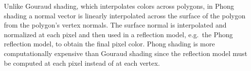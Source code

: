 Unlike Gouraud shading, which interpolates colors across polygons, in Phong
shading a normal vector is linearly interpolated across the surface of the
polygon from the polygon's vertex normals. The surface normal is interpolated
and normalized at each pixel and then used in a reflection model, e.g.\ the
Phong reflection model, to obtain the final pixel color. Phong shading is more
computationally expensive than Gouraud shading since the reflection model must
be computed at each pixel instead of at each vertex.
